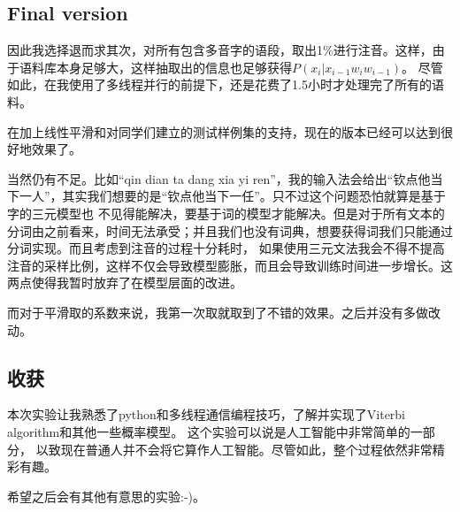 \documentclass[a4paper,10pt]{article}
\begin{document}
  \subsection{Final version}

  因此我选择退而求其次，对所有包含多音字的语段，取出1\%进行注音。这样，由于语料库本身足够大，这样抽取出的信息也足够获得$P(x_{i}|x_{i-1} w_{i} w_{i-1})$。
  尽管如此，在我使用了多线程并行的前提下，还是花费了1.5小时才处理完了所有的语料。

  在加上线性平滑和对同学们建立的测试样例集的支持，现在的版本已经可以达到很好地效果了。

  当然仍有不足。比如“qin dian ta dang xia yi ren”，我的输入法会给出“钦点他当下一人”，其实我们想要的是“钦点他当下一任”。只不过这个问题恐怕就算是基于字的三元模型也
  不见得能解决，要基于词的模型才能解决。但是对于所有文本的分词由之前看来，时间无法承受；并且我们也没有词典，想要获得词我们只能通过分词实现。而且考虑到注音的过程十分耗时，
  如果使用三元文法我会不得不提高注音的采样比例，这样不仅会导致模型膨胀，而且会导致训练时间进一步增长。这两点使得我暂时放弃了在模型层面的改进。

  而对于平滑取的系数来说，我第一次取就取到了不错的效果。之后并没有多做改动。

  \subsection{收获}

  本次实验让我熟悉了python和多线程通信编程技巧，了解并实现了Viterbi algorithm和其他一些概率模型。 这个实验可以说是人工智能中非常简单的一部分，
  以致现在普通人并不会将它算作人工智能。尽管如此，整个过程依然非常精彩有趣。

  希望之后会有其他有意思的实验:-)。
\end{document}
